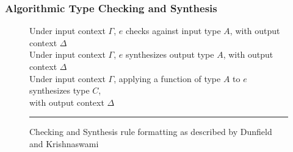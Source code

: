 \subsubsection{Algorithmic Type Checking and Synthesis}
\begin{figure}[t]
    \begin{minipage}{1\textwidth}
    {Under input context $\Gamma$, $e$ checks against input type $A$, 
    with output context $\Delta$} \\[1ex]
    {Under input context $\Gamma$, $e$ synthesizes output type $A$,
      with output context $\Delta$} \\[0.5ex]
    {Under input context $\Gamma$, applying a function of type $A$ to $e$ synthesizes type $C$, \\ with output context $\Delta$} \\
    \end{minipage}
    \noindent\rule{\textwidth}{0.4pt}
    \caption{Checking and Synthesis rule formatting as described by Dunfield and Krishnaswami \cite{completebidir}}
\end{figure}

